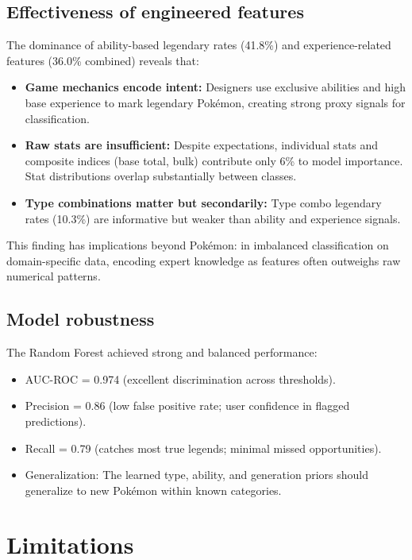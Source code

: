 \subsection{Effectiveness of engineered features}

The dominance of ability-based legendary rates (41.8\%) and experience-related features (36.0\% combined) reveals that:
\begin{itemize}
  \item \textbf{Game mechanics encode intent:} Designers use exclusive abilities and high base experience to mark legendary Pokémon, creating strong proxy signals for classification.
  \item \textbf{Raw stats are insufficient:} Despite expectations, individual stats and composite indices (base total, bulk) contribute only 6\% to model importance. Stat distributions overlap substantially between classes.
  \item \textbf{Type combinations matter but secondarily:} Type combo legendary rates (10.3\%) are informative but weaker than ability and experience signals.
\end{itemize}

This finding has implications beyond Pokémon: in imbalanced classification on domain-specific data, encoding expert knowledge as features often outweighs raw numerical patterns.

\subsection{Model robustness}

The Random Forest achieved strong and balanced performance:
\begin{itemize}
  \item AUC-ROC = 0.974 (excellent discrimination across thresholds).
  \item Precision = 0.86 (low false positive rate; user confidence in flagged predictions).
  \item Recall = 0.79 (catches most true legends; minimal missed opportunities).
  \item Generalization: The learned type, ability, and generation priors should generalize to new Pokémon within known categories.
\end{itemize}

\section{Limitations}
\label{sec:limitations}

